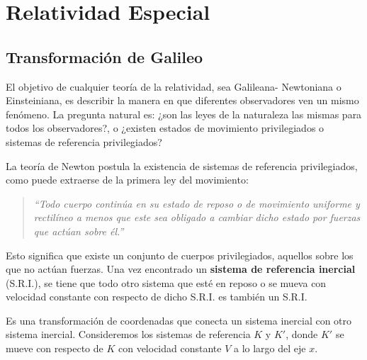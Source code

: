 \chapter{Relatividad Especial}

\section{Transformación de Galileo}

\begin{observacion}
El objetivo de cualquier teoría de la relatividad, sea Galileana-
Newtoniana o Einsteiniana, es describir la manera en que diferentes
observadores ven un mismo fenómeno. La pregunta natural es: ¿son las
leyes de la naturaleza las mismas para todos los observadores?, o
¿existen estados de movimiento privilegiados o sistemas de referencia
privilegiados?
\end{observacion}

La teoría de Newton postula la existencia de sistemas de referencia
privilegiados, como puede extraerse de la primera ley del movimiento:

\begin{quote}
\emph{``Todo cuerpo continúa en su estado de reposo o de movimiento
uniforme y rectilíneo a menos que este sea obligado a cambiar dicho
estado por fuerzas que actúan sobre él.''}
\end{quote}

Esto significa que existe un conjunto de cuerpos privilegiados, aquellos
sobre los que no actúan fuerzas. Una vez encontrado un \textbf{sistema de
referencia inercial} (S.R.I.), se tiene que todo otro sistema que esté
en reposo o se mueva con velocidad constante con respecto de dicho
S.R.I. es también un S.R.I.

\begin{definicion}
Es una transformación de coordenadas que conecta un sistema inercial con
otro sistema inercial. Consideremos los sistemas de referencia $K$ y
$K'$, donde $K'$ se mueve con respecto de $K$ con velocidad constante
$V$ a lo largo del eje $x$.
\end{definicion}

\begin{center}
\end{center}

